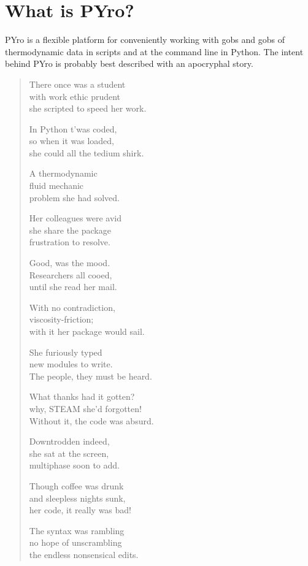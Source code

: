 \section{What is PYro?}
PYro is a flexible platform for conveniently working with gobs and gobs of thermodynamic data in scripts and at the command line in Python.  The intent behind PYro is probably best described with an apocryphal story.

\begin{verse}
There once was a student\\
with work ethic prudent\\
she scripted to speed her work.

In Python t'was coded,\\
so when it was loaded,\\
she could all the tedium shirk.

A thermodynamic\\
fluid mechanic\\
problem she had solved.

Her colleagues were avid\\
she share the package\\
frustration to resolve.

Good, was the mood.\\
Researchers all cooed,\\
until she read her mail.

With no contradiction,\\
viscosity-friction;\\
with it her package would sail.

She furiously typed\\
new modules to write.\\
The people, they must be heard.

What thanks had it gotten?\\
why, STEAM she'd forgotten!\\
Without it, the code was absurd.

Downtrodden indeed,\\
she sat at the screen,\\
multiphase soon to add.

Though coffee was drunk\\
and sleepless nights sunk,\\
her code, it really was bad!

The syntax was rambling\\
no hope of unscrambling\\
the endless nonsensical edits.


\end{verse}
